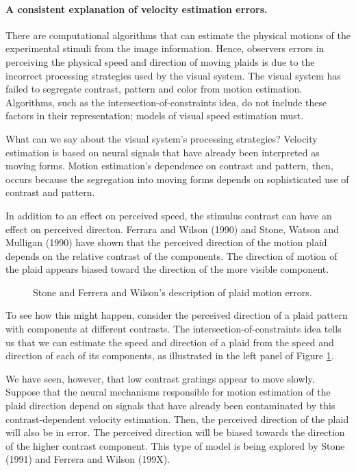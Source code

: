 

\paragraph{A consistent explanation of velocity estimation errors.}
There are computational algorithms that can estimate
the physical motions of the experimental stimuli
from the image information.
Hence, observers errors in perceiving the physical
speed and direction of moving plaids
is due to the incorrect processing strategies
used by the visual system.
The visual system has failed to segregate contrast,
pattern and color from motion estimation.
Algorithms, such as the intersection-of-constraints
idea, do not include these factors in their representation;
models of visual speed estimation must.

What can we say about the visual system's processing strategies?
Velocity estimation is based on
neural signals that have already been interpreted
as moving forms.
Motion estimation's dependence
on contrast and pattern, then, occurs because the
segregation into moving forms depends on sophisticated use
of contrast and pattern.

In addition to an effect on perceived speed,
the stimulus contrast can have an effect on perceived directon.
Ferrara and Wilson (1990) and Stone, Watson and Mulligan (1990)
have shown that the perceived direction
of the motion plaid depends on the
relative contrast of the components.
The direction of motion of the plaid
appears biased toward the direction
of the more visible component.

\begin{figure}
\centerline{
}
\caption[Plaid Motion Depends on Components]{
Stone and Ferrera and Wilson's description of plaid motion
errors.
}
\label{f9:plaidMotion}
\end{figure}
To see how this might happen, consider the
perceived direction of a plaid pattern
with components at different contrasts.
The intersection-of-constraints idea tells us that
we can estimate the speed and direction of a plaid from
the speed and direction of each of its components,
as illustrated in the left panel of Figure \ref{f9:plaidMotion}.

We have seen, however, that
low contrast gratings appear to move slowly.
Suppose that the neural mechanisms responsible
for motion estimation of the plaid direction
depend on signals that have
already been contaminated by this contrast-dependent velocity
estimation.
Then, the perceived direction of the plaid
will also be in error.
The perceived direction will be biased towards
the direction of the higher contrast component.
This type of model is being
explored by Stone (1991) and
Ferrera and Wilson (199X).


